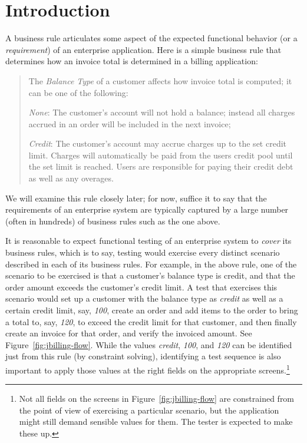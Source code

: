 \section{Introduction}

A business rule articulates some aspect of the expected functional behavior (or a \textit{requirement})
of an enterprise application. Here is a simple business rule that determines how an invoice total is 
determined in a billing application:

\begin{quote}
	The \textit{Balance Type} of a customer affects how invoice total is computed; it can be 
	one of the following:

	\textit{None}: The customer's account will not hold a balance; instead all charges accrued 
	in an order will be included in the next invoice;
	
	\textit{Credit}: The customer's account may accrue charges up to the set credit limit. 
	Charges will automatically be paid from the users credit pool until the set limit is reached. 
	Users are responsible for paying their credit debt as well as any overages.
\end{quote}	

We will examine this rule closely later; for now, suffice it to say that the requirements 
of an enterprise system are typically captured by a large number (often in hundreds) of business rules
such as the one above.

It is reasonable to expect functional testing of an enterprise system to \textit{cover} its 
business rules, which is to say, testing would exercise every distinct scenario described in each of
its business rules.  For example, in the above rule, one of the scenario to be exercised is
that a customer's balance type is credit, and that the order amount exceeds the customer's credit limit.  A test that exercises this scenario would set up a customer with the balance type as \textit{credit} 
as well as a certain credit limit, say, \textit{100}, create an order and add items to the order to bring 
a total to, say, \textit{120}, to exceed the credit limit for that customer, and then finally
create an invoice for that order, and verify the invoiced amount.  See Figure~\ref{fig:jbilling-flow}.
While the values \textit{credit}, \textit{100}, and \textit{120}
can be identified just from this rule (by constraint solving), identifying a test sequence is also important to apply those values at the right fields on the appropriate 
screens.\footnote{\small Not all fields on the screens in
Figure~\ref{fig:jbilling-flow} are constrained from the point of view of exercising a particular scenario,
but the application might still demand sensible values for them. The tester is expected to make these up.}

